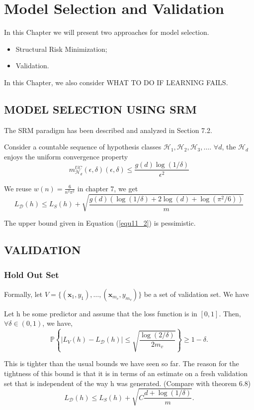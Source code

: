 
\section{Model Selection and Validation}

In this Chapter we will present two approaches for model selection.
\begin{itemize}
	\item Structural Risk Minimization;
	\item Validation.
\end{itemize}

{In this Chapter, we also consider WHAT TO DO IF LEARNING FAILS.}

\subsection{MODEL SELECTION USING SRM}

The SRM paradigm has been described and analyzed in Section 7.2.

Consider a countable sequence of hypothesis classes $\mathcal{H}_1, \mathcal{H}_2, \mathcal{H}_3, \dots$.
$\forall d$, the $\mathcal{H}_d$ enjoys the uniform convergence property
\begin{equation}
	m^{UC}_{\mathcal{H}_d}(\epsilon,\delta)(\epsilon, \delta) \le 
	\frac{g(d)\log(1/\delta)}{\epsilon^2}
\end{equation}

We reuse $w(n) = \frac{6}{n^2 \pi^2}$ in chapter 7, we get
\begin{equation}
	\label{equ11_2}
	L_\mathcal{D} (h) \le L_S(h) + \sqrt{\frac{g(d)( \log(1/\delta) + 2\log(d) + \log(\pi^2/6) )}{m} }
\end{equation}

The upper bound given in Equation (\ref{equ11_2}) is pessimistic.

\subsection{VALIDATION}

\subsubsection{Hold Out Set}

Formally, let $V = \{ (\mathbf{x}_1, y_1), \dots, (\mathbf{x}_{m_v}, y_{m_v}) \} $ be a set of validation set.
We have
\begin{thm}
	\label{thm11_1}
	Let h be some predictor and assume that the loss function is in $[0,1]$. Then, $\forall \delta \in (0, 1)$,
	we have,
	\[ \mathbb{P} \left\{ | L_V(h)-L_\mathcal{D}(h) | \le \sqrt{ \frac{\log(2/\delta)}{2m_v} } \right\} \ge 1- \delta.\]
\end{thm}
This is tighter than the usual bounds we have seen so far. The reason for the tightness of this bound is that
it is in terms of an estimate on a fresh validation set that is independent of the way h was generated. (Compare with theorem 6.8)
\[ L_\mathcal {D} (h) \le L_S (h) + \sqrt {C \frac{d+\log(1/\delta)}{m}}.\]

